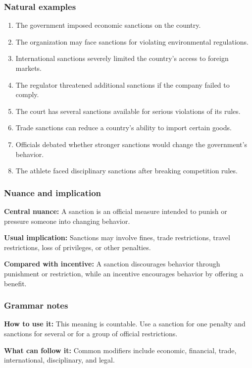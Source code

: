 \documentclass[11pt]{article}
\begin{document}
\subsubsection{Natural examples}
\begin{enumerate}
  \item The government imposed economic sanctions on the country.
  \item The organization may face sanctions for violating environmental regulations.
  \item International sanctions severely limited the country's access to foreign markets.
  \item The regulator threatened additional sanctions if the company failed to comply.
  \item The court has several sanctions available for serious violations of its rules.
  \item Trade sanctions can reduce a country's ability to import certain goods.
  \item Officials debated whether stronger sanctions would change the government's behavior.
  \item The athlete faced disciplinary sanctions after breaking competition rules.
\end{enumerate}

\subsubsection{Nuance and implication}
\textbf{Central nuance:} A sanction is an official measure intended to punish or pressure someone into changing behavior.

\textbf{Usual implication:} Sanctions may involve fines, trade restrictions, travel restrictions, loss of privileges, or other penalties.

\textbf{Compared with incentive:} A sanction discourages behavior through punishment or restriction, while an incentive encourages behavior by offering a benefit.

\subsubsection{Grammar notes}
\textbf{How to use it:} This meaning is countable. Use a sanction for one penalty and sanctions for several or for a group of official restrictions.

\textbf{What can follow it:} Common modifiers include economic, financial, trade, international, disciplinary, and legal.
\end{document}
